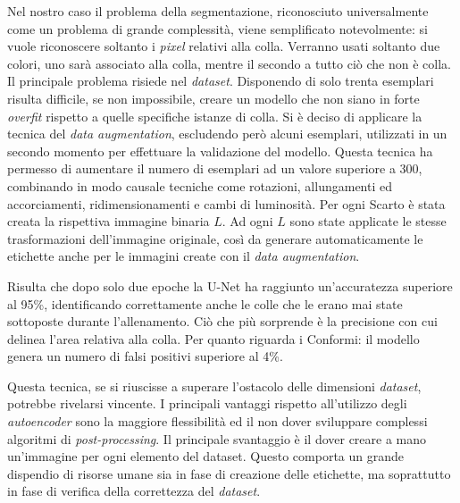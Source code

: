 Nel nostro caso il problema della segmentazione, riconosciuto universalmente come un problema di grande complessità, viene semplificato notevolmente: si vuole riconoscere soltanto i \textit{pixel} relativi alla colla.
Verranno usati soltanto due colori, uno sarà associato alla colla, mentre il secondo a tutto ciò che non è colla.
Il principale problema risiede nel \textit{dataset}.
Disponendo di solo trenta esemplari risulta difficile, se non impossibile, creare un modello che non siano in forte \textit{overfit} rispetto a quelle specifiche istanze di colla.
Si è deciso di applicare la tecnica del \textit{data augmentation}, escludendo però alcuni esemplari, utilizzati in un secondo momento per effettuare la validazione del modello.
Questa tecnica ha permesso di aumentare il numero di esemplari ad un valore superiore a 300, combinando in modo causale tecniche come rotazioni, allungamenti ed accorciamenti, ridimensionamenti e cambi di luminosità.
Per ogni Scarto è stata creata la rispettiva immagine binaria $L$.
Ad ogni $L$ sono state applicate le stesse trasformazioni dell'immagine originale, così da generare automaticamente le etichette anche per le immagini create con il \textit{data augmentation}.

Risulta che dopo solo due epoche la U-Net ha raggiunto un'accuratezza superiore al 95\%, identificando correttamente anche le colle che le erano mai state sottoposte durante l'allenamento.
Ciò che più sorprende è la precisione con cui delinea l'area relativa alla colla.
Per quanto riguarda i Conformi: il modello genera un numero di falsi positivi superiore al 4\%.

Questa tecnica, se si riuscisse a superare l'ostacolo delle dimensioni \textit{dataset}, potrebbe rivelarsi vincente.
I principali vantaggi rispetto all'utilizzo degli \textit{autoencoder} sono la maggiore flessibilità ed il non dover sviluppare complessi algoritmi di \textit{post-processing}.
Il principale svantaggio è il dover creare a mano un'immagine per ogni elemento del dataset.
Questo comporta un grande dispendio di risorse umane sia in fase di creazione delle etichette, ma soprattutto in fase di verifica della correttezza del \textit{dataset}.

